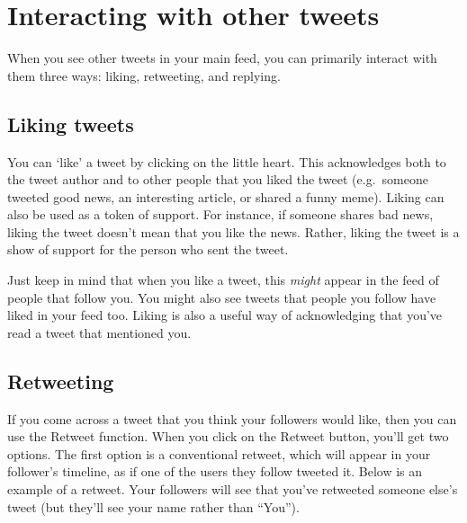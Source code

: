 \documentclass[]{book}
\begin{document}
\hypertarget{interacting-with-other-tweets}{%
\section{Interacting with other tweets}\label{interacting-with-other-tweets}}

When you see other tweets in your main feed, you can primarily interact with them three ways: liking, retweeting, and replying.

\hypertarget{liking-tweets}{%
\subsection{Liking tweets}\label{liking-tweets}}

You can `like' a tweet by clicking on the little heart. This acknowledges both to the tweet author and to other people that you liked the tweet (e.g.~someone tweeted good news, an interesting article, or shared a funny meme). Liking can also be used as a token of support. For instance, if someone shares bad news, liking the tweet doesn't mean that you like the news. Rather, liking the tweet is a show of support for the person who sent the tweet.

Just keep in mind that when you like a tweet, this \emph{might} appear in the feed of people that follow you. You might also see tweets that people you follow have liked in your feed too. Liking is also a useful way of acknowledging that you've read a tweet that mentioned you.

\hypertarget{retweeting}{%
\subsection{Retweeting}\label{retweeting}}

If you come across a tweet that you think your followers would like, then you can use the Retweet function. When you click on the Retweet button, you'll get two options. The first option is a conventional retweet, which will appear in your follower's timeline, as if one of the users they follow tweeted it. Below is an example of a retweet. Your followers will see that you've retweeted someone else's tweet (but they'll see your name rather than ``You'').
\end{document}
